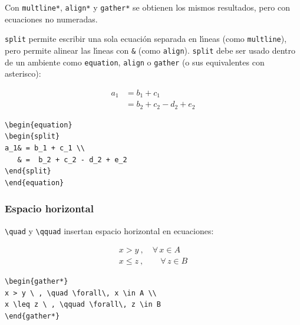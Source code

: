 {Con \verb+multline*+, \verb+align*+ y \verb+gather*+ se obtienen los
mismos resultados, pero con  ecuaciones no numeradas.


\verb+split+ permite escribir una sola ecuaci\'on separada en l\'{\i}neas (como
\verb+multline+), pero permite alinear las l\'{\i}neas con \verb+&+
(como \verb+align+). \verb+split+ debe ser usado dentro de un ambiente
como \verb+equation+, \verb+align+ o \verb+gather+ (o sus equivalentes
con asterisco):

\vspace{.3cm}
{\small
\begin{minipage}[c]{7cm}
\begin{equation}
\begin{split}
a_1& = b_1 + c_1 \\
   & =  b_2 + c_2 - d_2 + e_2
\end{split}
\end{equation}
\end{minipage}
\hspace{2cm}
\begin{minipage}[t]{7cm}
\begin{verbatim}
\begin{equation}
\begin{split}
a_1& = b_1 + c_1 \\
   & =  b_2 + c_2 - d_2 + e_2
\end{split}
\end{equation}
\end{verbatim}
\end{minipage}
}
\vspace{.3cm}

\subsubsection{Espacio horizontal}

\verb+\quad+ y \verb+\qquad+ insertan espacio horizontal en
ecuaciones:

\vspace{.3cm}
{\small
\begin{minipage}[c]{5cm}
\begin{gather*}
x > y \ , \quad \forall\, x \in A \\
x \leq z \ , \qquad \forall\, z \in B
\end{gather*}
\end{minipage}
\hspace{2cm}
\begin{minipage}[t]{5cm}
\begin{verbatim}
\begin{gather*}
x > y \ , \quad \forall\, x \in A \\
x \leq z \ , \qquad \forall\, z \in B
\end{gather*}
\end{verbatim}
\end{minipage}
}
\vspace{.3cm}


}
